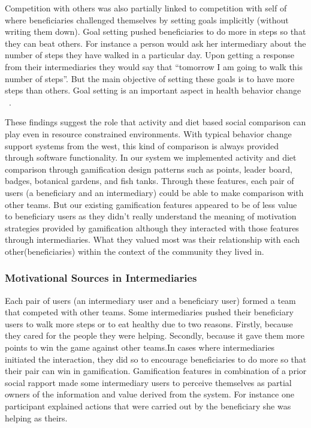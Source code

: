 \documentclass{sig-alternate}
\begin{document}
Competition with others was also partially linked to competition with self of
where beneficiaries challenged themselves by setting goals implicitly (without
writing them down). Goal setting pushed beneficiaries to do more in steps so
that they can beat others. For instance a person would ask her intermediary
about the number of steps they have walked in a particular day. Upon getting a
response from their intermediaries they would say that ``tomorrow I am going
to walk this number of steps''. But the main objective of setting these goals
is to have more steps than others. Goal setting is an important aspect in
health behavior change ~\cite{strecher1995goal}.

These findings suggest the role that activity and diet based social comparison
can play even in resource constrained environments. With typical behavior
change support systems from the west, this kind of comparison is always
provided through software functionality. In our system we implemented activity
and diet comparison through gamification design patterns such as points,
leader board, badges, botanical gardens, and fish tanks. Through these
features, each pair of users (a beneficiary and an intermediary) could be able
to make comparison with other teams. But our existing gamification features
appeared to be of less value to beneficiary users as they didn't really
understand the meaning of motivation strategies provided by gamification
although they interacted with those features through intermediaries. What they
valued most was their relationship with each other(beneficiaries) within the
context of the community they lived in.

\subsubsection*{\textbf{Motivational Sources in Intermediaries}} 

Each pair of users (an intermediary user and a beneficiary user) formed a team
that competed with other teams.  Some intermediaries pushed their beneficiary
users to walk more steps or to eat healthy due to two reasons. Firstly,
because they cared for the people they were helping. Secondly, because it gave
them more points to win the game against other teams.In cases where
intermediaries initiated the interaction, they did so to encourage
beneficiaries to do more so that their pair can win in gamification.
Gamification features in combination of a prior social rapport made some
intermediary users to perceive themselves as partial owners of the information
and value derived from the system. For instance one participant explained
actions that were carried out by the beneficiary she was helping as theirs.
\end{document}
